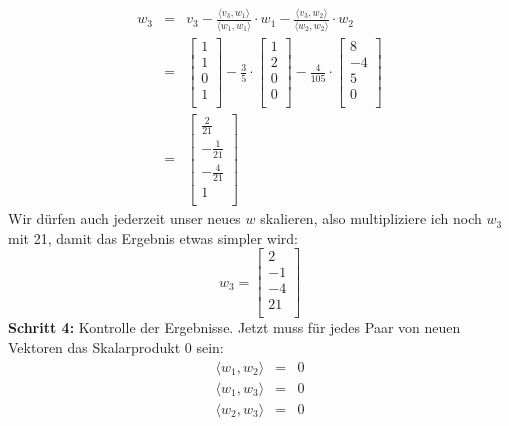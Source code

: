 \documentclass{report}
\begin{document}
			\begin{eqnarray*}
				w_3 &=& v_3 - \frac{\langle v_3, w_1 \rangle}{\langle w_1, w_1 \rangle} \cdot w_1 - \frac{\langle v_3, w_2 \rangle}{\langle w_2, w_2 \rangle} \cdot w_2\\
				&=& \begin{bmatrix} 1 \\ 1 \\ 0 \\ 1 \\ \end{bmatrix} - \frac35 \cdot \begin{bmatrix} 1 \\ 2 \\ 0 \\ 0 \\ \end{bmatrix} - \frac4{105} \cdot \begin{bmatrix} 8 \\ -4 \\ 5 \\ 0 \\ \end{bmatrix} \\
				&=& \begin{bmatrix} \frac2{21} \\ -\frac{1}{21} \\ -\frac4{21} \\ 1 \\ \end{bmatrix}
			\end{eqnarray*}
			Wir dürfen auch jederzeit unser neues $w$ skalieren, also multipliziere ich noch $w_3$ mit 21, damit das Ergebnis etwas simpler wird:\\
			\begin{equation*}
				w_3 =  \begin{bmatrix} 2 \\ -1 \\ -4 \\ 21 \\ \end{bmatrix}
			\end{equation*}
			\textbf{Schritt 4:}
			Kontrolle der Ergebnisse. Jetzt muss für jedes Paar von neuen Vektoren das Skalarprodukt 0 sein:
			\begin{eqnarray*}
				\langle w_1, w_2 \rangle &=& 0 \\
				\langle w_1, w_3 \rangle &=& 0 \\
				\langle w_2, w_3 \rangle &=& 0
			\end{eqnarray*}
\end{document}
